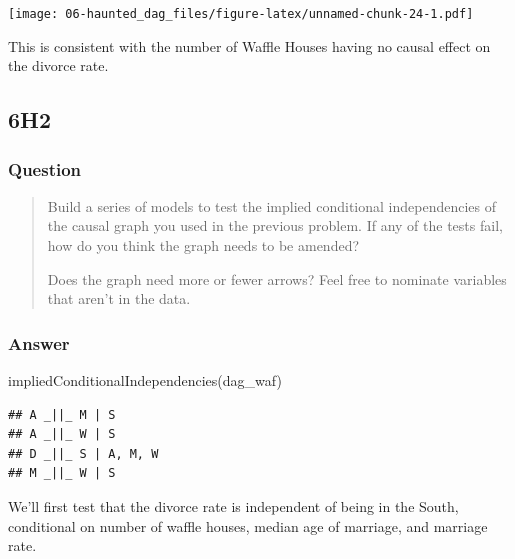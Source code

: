 \documentclass[
]{book}
\newenvironment{Shaded}{\begin{snugshade}}{\end{snugshade}}
\newcommand{\FunctionTok}[1]{\textcolor[rgb]{0.00,0.00,0.00}{#1}}
\newcommand{\NormalTok}[1]{#1}
\begin{document}
\texttt{[image: 06-haunted\_dag\_files/figure-latex/unnamed-chunk-24-1.pdf]}

This is consistent with the number of Waffle Houses having no causal effect on the divorce rate.

\hypertarget{h2-2}{%
\subsection*{6H2}\label{h2-2}}

\hypertarget{question-56}{%
\subsubsection*{Question}\label{question-56}}

\begin{quote}
Build a series of models to test the implied conditional independencies of the causal graph you used in the previous problem. If any of the tests fail, how do you think the graph needs to be amended?

Does the graph need more or fewer arrows? Feel free to nominate variables that aren't in the data.
\end{quote}

\hypertarget{answer-56}{%
\subsubsection*{Answer}\label{answer-56}}

\begin{Shaded}
\begin{Highlighting}[]
\FunctionTok{impliedConditionalIndependencies}\NormalTok{(dag\_waf)}
\end{Highlighting}
\end{Shaded}

\begin{verbatim}
## A _||_ M | S
## A _||_ W | S
## D _||_ S | A, M, W
## M _||_ W | S
\end{verbatim}

We'll first test that the divorce rate is independent of being in the South, conditional on number of waffle houses, median age of marriage, and marriage rate.
\end{document}
